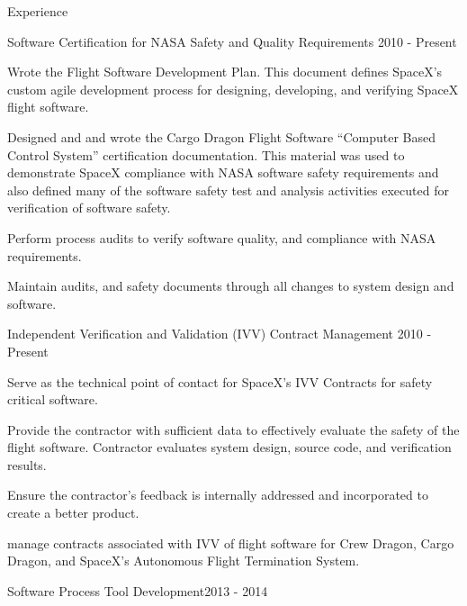 \documentclass{resume} %
\begin{document}
\begin{rSection}{Experience}

\begin{rSubsection}{Software Certification for NASA Safety and Quality Requirements} {2010 - Present}{}{}

\item Wrote the Flight Software Development Plan. This document defines SpaceX's
  custom agile development process for designing, developing, and verifying
  SpaceX flight software.
\item Designed and and wrote the Cargo Dragon Flight Software ``Computer Based
  Control System'' certification documentation. This material was used to
  demonstrate SpaceX compliance with NASA software safety requirements and also
  defined many of the software safety test and analysis activities executed for
  verification of software safety.
\item Perform process audits to verify software quality, and
  compliance with NASA requirements.
\item Maintain audits, and safety documents through all changes to
  system design and software.

\end{rSubsection}

\begin{rSubsection}{Independent Verification and Validation (IVV) Contract Management} {2010 - Present}{}{}

\item Serve as the technical point of contact for SpaceX's IVV Contracts for
  safety critical software.
\item Provide the contractor with sufficient data to effectively
  evaluate the safety of the flight software. Contractor evaluates
  system design, source code, and verification results.
\item Ensure the contractor's feedback is internally addressed and
  incorporated to create a better product.
\item manage contracts associated with IVV of flight software for Crew
  Dragon, Cargo Dragon, and SpaceX's Autonomous Flight Termination
  System.

\end{rSubsection}


\begin{rSubsection}{Software Process Tool Development}{2013 - 2014}{}{}


\end{rSubsection}
\end{rSection}
\end{document}
